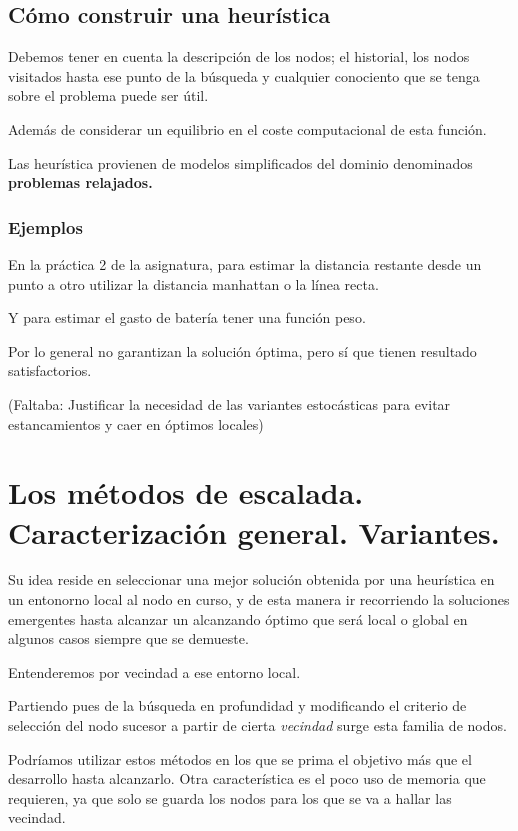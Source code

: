 \documentclass[12 pt, a4paper]{article}
\begin{document}
\subsection{Cómo construir una heurística}

Debemos tener en cuenta la descripción de los nodos; el historial, los nodos visitados hasta 
ese punto de la búsqueda y cualquier conociento que se tenga sobre el problema puede ser útil. 

Además de considerar un equilibrio en el coste computacional de esta función. 

Las heurística provienen de modelos simplificados del dominio denominados \textbf{problemas relajados.}

\subsubsection{Ejemplos}
En la práctica 2 de la asignatura, para estimar la distancia restante desde un punto a otro utilizar la distancia manhattan o la línea recta. 

Y para estimar el gasto de batería tener una función peso. 



Por lo general no garantizan la solución óptima, pero sí que tienen resultado satisfactorios.

\newpage

(Faltaba: Justificar la necesidad de las variantes estocásticas para evitar estancamientos y caer en óptimos locales)

\section{Los métodos de escalada. Caracterización general. Variantes.}
Su idea reside en seleccionar una mejor solución obtenida por una heurística en un entonorno 
local al nodo en curso, y de esta manera ir recorriendo la soluciones emergentes hasta alcanzar un alcanzando óptimo que será local 
o global en algunos casos siempre que se demueste.

Entenderemos por vecindad a ese entorno local. 

Partiendo pues de la búsqueda en profundidad y modificando el criterio 
de selección del nodo sucesor a partir de cierta \textit{vecindad} surge esta familia de nodos. 

Podríamos utilizar estos métodos en los que se prima el objetivo más que el desarrollo hasta alcanzarlo. 
Otra característica es el poco uso de memoria que requieren, ya que solo se guarda los nodos para los que se va a hallar las
vecindad. 
\end{document}
